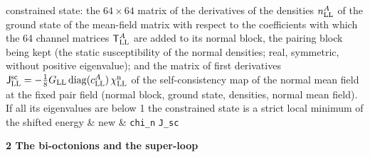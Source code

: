 \documentclass[
  10pt,
]{article}
\begin{document}
\begin{longtable}[]
constrained state: the \(64\times64\) matrix of the derivatives of the
densities \(n^A_{\rm LL}\) of the ground state of the mean-field matrix
with respect to the coefficients with which the 64 channel matrices
\(\mathsf T^A_{\rm LL}\) are added to its normal block, the pairing
block being kept (the static susceptibility of the normal densities;
real, symmetric, without positive eigenvalue); and the matrix of first
derivatives
\(\mathsf J^{\rm sc}_{\rm LL}=-\tfrac18G_{\rm LL}\,\mathrm{diag}(c^A_{\rm LL})\,\chi^{\rm n}_{\rm LL}\)
of the self-consistency map of the normal mean field at the fixed pair
field (normal block, ground state, densities, normal mean field). If all
its eigenvalues are below 1 the constrained state is a strict local
minimum of the shifted energy & new & \texttt{chi\_n} \texttt{J\_sc} \\
\end{longtable}

\textbf{2 The bi-octonions and the super-loop}
\end{document}
